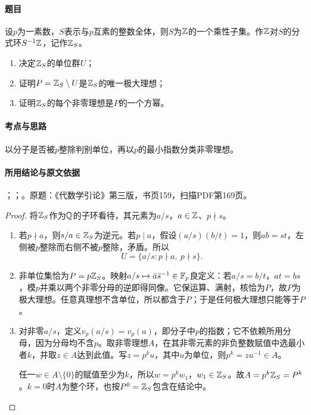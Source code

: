 \label{ex:4:26}

\paragraph{题目}

设$p$为一素数，$S$表示与$p$互素的整数全体，则$S$为$\mathbb Z$的一个乘性子集。作$\mathbb Z$对$S$的分式环$S^{-1}\mathbb Z$，记作$\mathbb Z_S$。
\begin{enumerate}[label=(\roman*)]
\item 决定$\mathbb Z_S$的单位群$U$；
\item 证明$P=\mathbb Z_S\setminus U$是$\mathbb Z_S$的唯一极大理想；
\item 证明$\mathbb Z_S$的每个非零理想是$P$的一个方幂。
\end{enumerate}

\paragraph{考点与思路}

以分子是否被$p$整除判别单位，再以$p$的最小指数分类非零理想。

\paragraph{所用结论与原文依据}

；；。原题：《代数学引论》第三版，书页159，扫描PDF第169页。


\begin{proof}

将$\mathbb Z_S$作为$\mathbb Q$的子环看待，其元素为$a/s$，$a\in\mathbb Z$、$p\nmid s$。
\begin{enumerate}[label=(\roman*)]
\item 若$p\nmid a$，则$s/a\in\mathbb Z_S$为逆元。若$p\mid a$，假设$(a/s)(b/t)=1$，则$ab=st$，左侧被$p$整除而右侧不被$p$整除，矛盾。所以
\[
U=\{a/s:p\nmid a,\ p\nmid s\}.
\]
\item 非单位集恰为$P=p\mathbb Z_S$。映射$a/s\mapsto\bar a\bar s^{-1}\in\mathbb F_p$良定义：若$a/s=b/t$，$at=bs$，模$p$并乘以两个非零分母的逆即得同像。它保运算、满射，核恰为$P$，故$P$为极大理想。任意真理想不含单位，所以都含于$P$；于是任何极大理想只能等于$P$。
\item 对非零$a/s$，定义$v_p(a/s)=v_p(a)$，即分子中$p$的指数；它不依赖所用分母，因为分母均不含$p$。取非零理想$A$，在其非零元素的非负整数赋值中选最小者$k$，并取$z\in A$达到此值。写$z=p^k u$，其中$u$为单位，则$p^k=zu^{-1}\in A$。

任一$w\in A\setminus\{0\}$的赋值至少为$k$，所以$w=p^k w_1$，$w_1\in\mathbb Z_S$。故$A=p^k\mathbb Z_S=P^k$。$k=0$时$A$为整个环，也按$P^0=\mathbb Z_S$包含在结论中。
\end{enumerate}

\end{proof}

